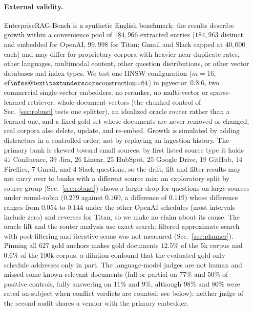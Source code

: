 \documentclass{ieeeaccess}
\makeatletter
\DeclareRobustCommand{\_}{\ifmmode\nfss@text{\textunderscore}\else\textunderscore\allowbreak\fi}
\makeatother
\begin{document}
\paragraph{External validity.}
EnterpriseRAG-Bench is a synthetic English benchmark; the results describe growth within a convenience pool of $184{,}966$ extracted entries ($184{,}963$ distinct and embedded for OpenAI, $99{,}998$ for Titan; Gmail and Slack capped at $40{,}000$ each) and may differ for proprietary corpora with heavier near-duplicate rates, other languages, multimodal content, other question distributions, or other vector databases and index types. We test one HNSW configuration ($m{=}16$, $\mathrm{ef\_construction}{=}64$) in pgvector~0.8.6, two commercial single-vector embedders, no reranker, no multi-vector or sparse-learned retriever, whole-document vectors (the chunked control of Sec.~\ref{sec:robust} tests one splitter), an idealized oracle router rather than a learned one, and a fixed gold set whose documents are never removed or changed; real corpora also delete, update, and re-embed. Growth is simulated by adding distractors in a controlled order, not by replaying an ingestion history. The primary bank is skewed toward small sources: by first listed source type it holds $41$ Confluence, $39$ Jira, $26$ Linear, $25$ HubSpot, $25$ Google Drive, $19$ GitHub, $14$ Fireflies, $7$ Gmail, and $4$ Slack questions, so the drift, lift and filter results may not carry over to banks with a different source mix; an exploratory split by source group (Sec.~\ref{sec:robust}) shows a larger drop for questions on large sources under round-robin ($0.279$ against $0.160$, a difference of $0.119$) whose difference ranges from $0.054$ to $0.144$ under the other OpenAI schedules (most intervals include zero) and reverses for Titan, so we make no claim about its cause. The oracle lift and the router analysis use exact search; filtered approximate search with post-filtering and iterative scans was not measured (Sec.~\ref{sec:planner}). Pinning all $627$ gold anchors makes gold documents $12.5\%$ of the $5\text{k}$ corpus and $0.6\%$ of the $100\text{k}$ corpus, a dilution confound that the evaluated-gold-only schedule addresses only in part. The language-model judges are not human and missed some known-relevant documents (full or partial on $77\%$ and $50\%$ of positive controls, fully answering on $11\%$ and $9\%$, although $98\%$ and $80\%$ were rated on-subject when conflict verdicts are counted; see below); neither judge of the second audit shares a vendor with the primary embedder.
\end{document}
